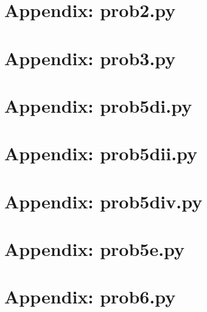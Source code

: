 \documentclass{article}
\begin{document}
\pagebreak

\section*{Appendix: prob2.py}




\section*{Appendix: prob3.py}




\section*{Appendix: prob5di.py}




\section*{Appendix: prob5dii.py}




\section*{Appendix: prob5div.py}




\section*{Appendix: prob5e.py}




\section*{Appendix: prob6.py}

\end{document}
